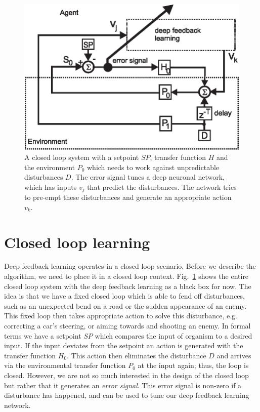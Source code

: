 \documentclass{aamas2017}
\begin{document}
\begin{figure}[!ht]
  \centering
  \includegraphics[width=0.75\columnwidth]{closed_loop}
  \caption{A closed loop system with a setpoint $SP$, transfer function $H$ and the
    environment $P_0$ which needs to work against unpredictable disturbances $D$.
    The error signal tunes a deep neuronal network, which has inputs
    $v_j$ that predict the disturbances. The network tries to pre-empt these
    disturbances and generate an appropriate action $v_k$.
    \label{closed_loop}}
\end{figure}

\section{Closed loop learning}

Deep feedback learning operates in a closed loop scenario. Before we
describe the algorithm, we need to place it in a closed loop
context. Fig.~\ref{closed_loop} shows the entire closed loop system
with the deep feedback learning as a black box for now. The idea
is that we have a fixed closed loop which is able to fend off
disturbances, such as an unexpected bend on a road or the sudden
appearance of an enemy. This fixed loop then takes appropriate action
to solve this disturbance, e.g. correcting a car's steering, or
aiming towards and shooting an enemy. In formal terms we have a
setpoint $SP$ which compares the input of organism to a desired
input. If the input deviates from the setpoint an action is generated
with the transfer function $H_0$. This action then eliminates the
disturbance $D$ and arrives via the environmental transfer function
$P_0$ at the input again; thus, the loop is closed. However, we are
not so much interested in the design of the closed loop
but rather that it generates an \textsl{error signal}. This error signal is
non-zero if a disturbance has happened, and can be
used to tune our deep feedback learning network.
\end{document}
